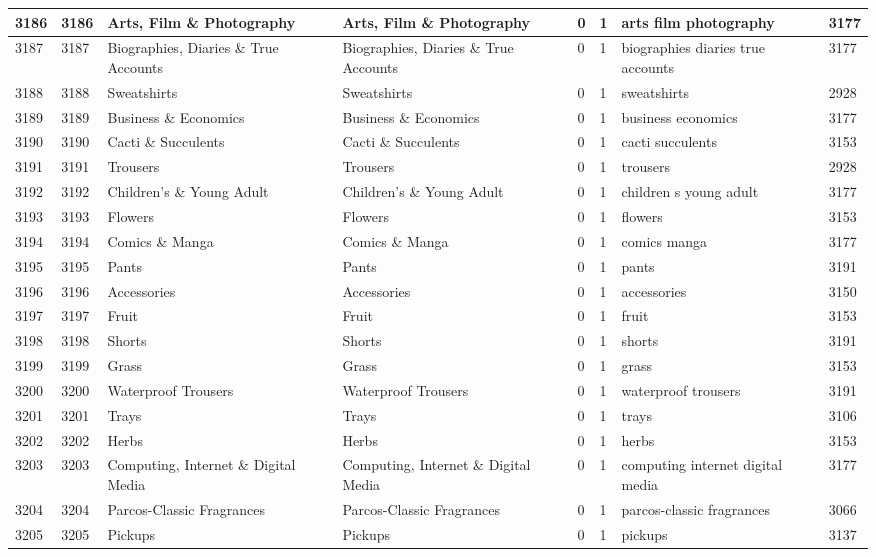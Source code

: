 \begin{longtable}{|l|l|l|l|l|l|l|l|}
3186 & 3186 & Arts, Film \& Photography & Arts, Film \& Photography & 0 & 1 & arts film photography & 3177 \\ \hline 
3187 & 3187 & Biographies, Diaries \& True Accounts & Biographies, Diaries \& True Accounts & 0 & 1 & biographies diaries true accounts & 3177 \\ \hline 
3188 & 3188 & Sweatshirts & Sweatshirts & 0 & 1 & sweatshirts & 2928 \\ \hline 
3189 & 3189 & Business \& Economics & Business \& Economics & 0 & 1 & business economics & 3177 \\ \hline 
3190 & 3190 & Cacti \& Succulents & Cacti \& Succulents & 0 & 1 & cacti succulents & 3153 \\ \hline 
3191 & 3191 & Trousers & Trousers & 0 & 1 & trousers & 2928 \\ \hline 
3192 & 3192 & Children's \& Young Adult & Children's \& Young Adult & 0 & 1 & children s young adult & 3177 \\ \hline 
3193 & 3193 & Flowers & Flowers & 0 & 1 & flowers & 3153 \\ \hline 
3194 & 3194 & Comics \& Manga & Comics \& Manga & 0 & 1 & comics manga & 3177 \\ \hline 
3195 & 3195 & Pants & Pants & 0 & 1 & pants & 3191 \\ \hline 
3196 & 3196 & Accessories & Accessories & 0 & 1 & accessories & 3150 \\ \hline 
3197 & 3197 & Fruit & Fruit & 0 & 1 & fruit & 3153 \\ \hline 
3198 & 3198 & Shorts & Shorts & 0 & 1 & shorts & 3191 \\ \hline 
3199 & 3199 & Grass & Grass & 0 & 1 & grass & 3153 \\ \hline 
3200 & 3200 & Waterproof Trousers & Waterproof Trousers & 0 & 1 & waterproof trousers & 3191 \\ \hline 
3201 & 3201 & Trays & Trays & 0 & 1 & trays & 3106 \\ \hline 
3202 & 3202 & Herbs & Herbs & 0 & 1 & herbs & 3153 \\ \hline 
3203 & 3203 & Computing, Internet \& Digital Media & Computing, Internet \& Digital Media & 0 & 1 & computing internet digital media & 3177 \\ \hline 
3204 & 3204 & Parcos-Classic Fragrances & Parcos-Classic Fragrances & 0 & 1 & parcos-classic fragrances & 3066 \\ \hline 
3205 & 3205 & Pickups & Pickups & 0 & 1 & pickups & 3137 \\ \hline 

\end{longtable}
